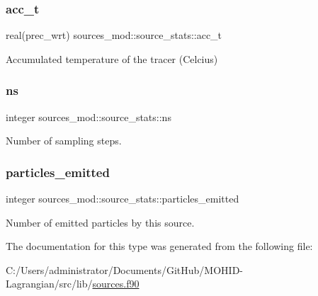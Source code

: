 \subsubsection{\texorpdfstring{acc\+\_\+t}{acc\_t}}
{\footnotesize\ttfamily real(prec\+\_\+wrt) sources\+\_\+mod\+::source\+\_\+stats\+::acc\+\_\+t\hspace{0.3cm}{\ttfamily [private]}}



Accumulated temperature of the tracer (Celcius) 

\mbox{\label{structsources__mod_1_1source__stats_a77ba33fcefa55c8d8e440844ee7f4640}} 
\subsubsection{\texorpdfstring{ns}{ns}}
{\footnotesize\ttfamily integer sources\+\_\+mod\+::source\+\_\+stats\+::ns\hspace{0.3cm}{\ttfamily [private]}}



Number of sampling steps. 

\mbox{\label{structsources__mod_1_1source__stats_a2253ced036ad1a9fee933b6b08135189}} 
\subsubsection{\texorpdfstring{particles\+\_\+emitted}{particles\_emitted}}
{\footnotesize\ttfamily integer sources\+\_\+mod\+::source\+\_\+stats\+::particles\+\_\+emitted\hspace{0.3cm}{\ttfamily [private]}}



Number of emitted particles by this source. 



The documentation for this type was generated from the following file\+:\begin{DoxyCompactItemize}
\item 
C\+:/\+Users/administrator/\+Documents/\+Git\+Hub/\+M\+O\+H\+I\+D-\/\+Lagrangian/src/lib/\hyperlink{sources_8f90}{sources.\+f90}\end{DoxyCompactItemize}
